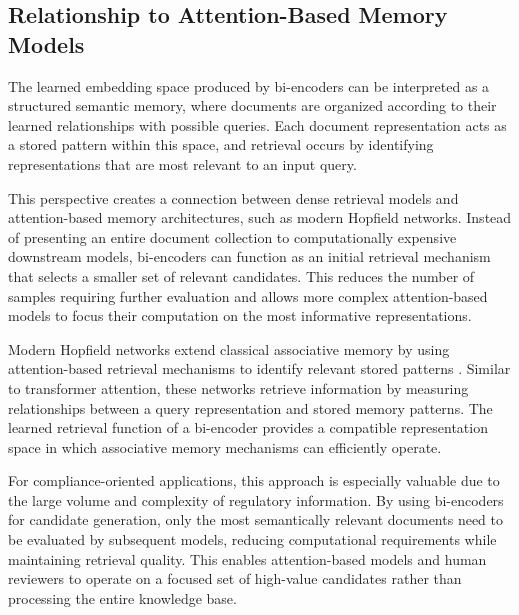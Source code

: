 \subsection{Relationship to Attention-Based Memory Models}

The learned embedding space produced by bi-encoders can be interpreted as a structured semantic memory, where documents are organized according to their learned relationships with possible queries. Each document representation acts as a stored pattern within this space, and retrieval occurs by identifying representations that are most relevant to an input query.

This perspective creates a connection between dense retrieval models and attention-based memory architectures, such as modern Hopfield networks. Instead of presenting an entire document collection to computationally expensive downstream models, bi-encoders can function as an initial retrieval mechanism that selects a smaller set of relevant candidates. This reduces the number of samples requiring further evaluation and allows more complex attention-based models to focus their computation on the most informative representations.

Modern Hopfield networks extend classical associative memory by using attention-based retrieval mechanisms to identify relevant stored patterns \cite{ramsauer2021hopfield}. Similar to transformer attention, these networks retrieve information by measuring relationships between a query representation and stored memory patterns. The learned retrieval function of a bi-encoder provides a compatible representation space in which associative memory mechanisms can efficiently operate.

For compliance-oriented applications, this approach is especially valuable due to the large volume and complexity of regulatory information. By using bi-encoders for candidate generation, only the most semantically relevant documents need to be evaluated by subsequent models, reducing computational requirements while maintaining retrieval quality. This enables attention-based models and human reviewers to operate on a focused set of high-value candidates rather than processing the entire knowledge base.